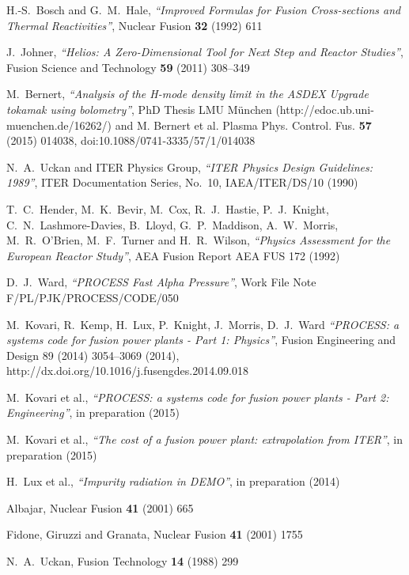 \begin{thebibliography}{99}
H.-S.\ Bosch and G.\ M.\ Hale,
\textit{``Improved Formulas for Fusion Cross-sections and Thermal Reactivities''},
Nuclear Fusion \textbf{32} (1992) 611

J.\ Johner,
\textit{``Helios: A Zero-Dimensional Tool for Next Step and Reactor Studies''},
Fusion Science and Technology \textbf{59} (2011) 308--349

M.\ Bernert,
\textit{``Analysis of the H-mode density limit in the ASDEX Upgrade tokamak using bolometry''},
PhD Thesis LMU München (http://edoc.ub.uni-muenchen.de/16262/) and M. Bernert et al. Plasma Phys. Control. Fus. \textbf{57} (2015) 014038, doi:10.1088/0741-3335/57/1/014038

N.\ A.\ Uckan and ITER Physics Group,
\textit{``ITER Physics Design Guidelines: 1989''},
ITER Documentation Series, No.\ 10, IAEA/ITER/DS/10
(1990)

T.\ C.\ Hender, M.\ K.\ Bevir, M.\ Cox, R.\ J.\ Hastie, P.\ J.\
Knight, C.\ N.\ Lashmore-Davies, B.\ Lloyd, G.\ P.\ Maddison, A.\ W.\
Morris, M.\ R.\ O'Brien, M.\ F.\ Turner and H.\ R.\ Wilson,
\textit{``Physics Assessment for the European Reactor Study''},
AEA Fusion Report AEA FUS 172
(1992)

D.\ J.\ Ward,
\textit{``PROCESS Fast Alpha Pressure''},
Work File Note F/PL/PJK/PROCESS/CODE/050

M.\ Kovari, R.\ Kemp, H.\ Lux, P.\ Knight, J.\ Morris, D.\ J.\ Ward
\textit{``PROCESS: a systems code for fusion power plants - Part 1: Physics''},
Fusion Engineering and Design 89 (2014) 3054–3069 (2014), 
http://dx.doi.org/10.1016/j.fusengdes.2014.09.018

M.\ Kovari et al.,
\textit{``PROCESS: a systems code for fusion power plants - Part 2: Engineering''},
in preparation (2015)

M.\ Kovari et al.,
\textit{``The cost of a fusion power plant: extrapolation from ITER''},
in preparation (2015)

H.\ Lux et al.,
\textit{``Impurity radiation in DEMO''},
in preparation (2014)

Albajar,
Nuclear Fusion \textbf{41} (2001) 665

Fidone, Giruzzi and Granata,
Nuclear Fusion \textbf{41} (2001) 1755

N.\ A.\ Uckan,
Fusion Technology \textbf{14} (1988) 299


\end{thebibliography}
